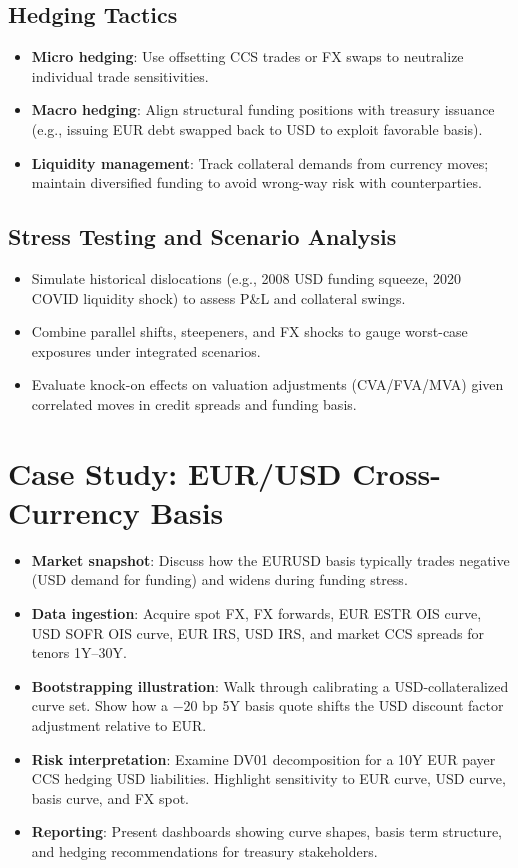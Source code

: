\documentclass[11pt]{article}
\begin{document}
\subsection{Hedging Tactics}
\begin{itemize}[leftmargin=*]
  \item \textbf{Micro hedging}: Use offsetting CCS trades or FX swaps to neutralize individual trade sensitivities.
  \item \textbf{Macro hedging}: Align structural funding positions with treasury issuance (e.g., issuing EUR debt swapped back to USD to exploit favorable basis).
  \item \textbf{Liquidity management}: Track collateral demands from currency moves; maintain diversified funding to avoid wrong-way risk with counterparties.
\end{itemize}

\subsection{Stress Testing and Scenario Analysis}
\begin{itemize}[leftmargin=*]
  \item Simulate historical dislocations (e.g., 2008 USD funding squeeze, 2020 COVID liquidity shock) to assess P\&L and collateral swings.
  \item Combine parallel shifts, steepeners, and FX shocks to gauge worst-case exposures under integrated scenarios.
  \item Evaluate knock-on effects on valuation adjustments (CVA/FVA/MVA) given correlated moves in credit spreads and funding basis.
\end{itemize}

\section{Case Study: EUR/USD Cross-Currency Basis}
\begin{itemize}[leftmargin=*]
  \item \textbf{Market snapshot}: Discuss how the EURUSD basis typically trades negative (USD demand for funding) and widens during funding stress.
  \item \textbf{Data ingestion}: Acquire spot FX, FX forwards, EUR ESTR OIS curve, USD SOFR OIS curve, EUR IRS, USD IRS, and market CCS spreads for tenors 1Y--30Y.
  \item \textbf{Bootstrapping illustration}: Walk through calibrating a USD-collateralized curve set. Show how a $-20$ bp 5Y basis quote shifts the USD discount factor adjustment relative to EUR.
  \item \textbf{Risk interpretation}: Examine DV01 decomposition for a 10Y EUR payer CCS hedging USD liabilities. Highlight sensitivity to EUR curve, USD curve, basis curve, and FX spot.
  \item \textbf{Reporting}: Present dashboards showing curve shapes, basis term structure, and hedging recommendations for treasury stakeholders.
\end{itemize}
\end{document}
